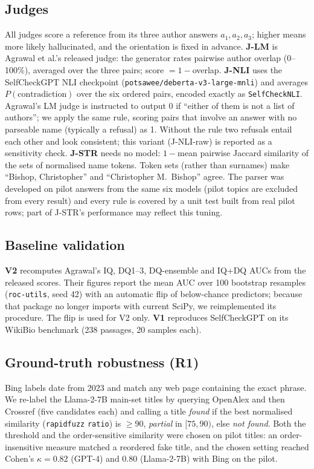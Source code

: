 \documentclass[acmsmall,screen]{acmart}
\begin{document}
\subsection{Judges}
All judges score a reference from its three author answers $a_1,a_2,a_3$; higher means more likely hallucinated, and the orientation is fixed in advance.
\textbf{J-LM} is Agrawal et al.'s released judge: the generator rates pairwise author overlap (0--100\%), averaged over the three pairs; score $=1-$overlap.
\textbf{J-NLI} uses the SelfCheckGPT NLI checkpoint (\texttt{potsawee/deberta-v3-large-mnli}) and averages $P(\text{contradiction})$ over the six ordered pairs, encoded exactly as \texttt{SelfCheckNLI}. Agrawal's LM judge is instructed to output 0 if ``either of them is not a list of authors''; we apply the same rule, scoring pairs that involve an answer with no parseable name (typically a refusal) as 1. Without the rule two refusals entail each other and look consistent; this variant (J-NLI-raw) is reported as a sensitivity check.
\textbf{J-STR} needs no model: $1-$mean pairwise Jaccard similarity of the sets of normalised name tokens. Token sets (rather than surnames) make ``Bishop, Christopher'' and ``Christopher M.\ Bishop'' agree. The parser was developed on pilot answers from the same six models (pilot topics are excluded from every result) and every rule is covered by a unit test built from real pilot rows; part of J-STR's performance may reflect this tuning.

\subsection{Baseline validation}
\textbf{V2} recomputes Agrawal's IQ, DQ1--3, DQ-ensemble and IQ+DQ AUCs from the released scores. Their figures report the mean AUC over 100 bootstrap resamples (\texttt{roc-utils}, seed 42) with an automatic flip of below-chance predictors; because that package no longer imports with current SciPy, we reimplemented its procedure. The flip is used for V2 only. \textbf{V1} reproduces SelfCheckGPT on its WikiBio benchmark (238 passages, 20 samples each).

\subsection{Ground-truth robustness (R1)}
Bing labels date from 2023 and match any web page containing the exact phrase. We re-label the Llama-2-7B main-set titles by querying OpenAlex and then Crossref (five candidates each) and calling a title \emph{found} if the best normalised similarity (\texttt{rapidfuzz} \texttt{ratio}) is $\ge 90$, \emph{partial} in $[75,90)$, else \emph{not found}. Both the threshold and the order-sensitive similarity were chosen on pilot titles: an order-insensitive measure matched a reordered fake title, and the chosen setting reached Cohen's $\kappa=0.82$ (GPT-4) and $0.80$ (Llama-2-7B) with Bing on the pilot.
\end{document}
